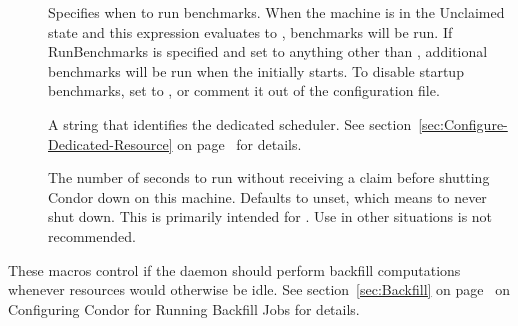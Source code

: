 \begin{description}
\item[] \label{param:RunBenchmarks}
  Specifies when to run benchmarks.
  When the machine is in the Unclaimed state and this expression
  evaluates to , benchmarks will be run.
  If RunBenchmarks is specified and set to anything other than ,
  additional benchmarks will be run when the  initially starts.
  To disable startup benchmarks, set  to ,
  or comment it out of the configuration file.

\item[] \label{param:DedicatedScheduler}
  A string that identifies the dedicated scheduler.
  See section~\ref{sec:Configure-Dedicated-Resource}
  on page~\pageref{sec:Configure-Dedicated-Resource} for details.

\item[] \label{param:StartdNoclaimShutdown}
  The number of seconds to run without receiving a claim before
  shutting Condor down on this machine.  Defaults to unset, which
  means to never shut down.  This is primarily intended for .
  Use in other situations is not recommended.

\end{description}

These macros control if the  daemon should perform
backfill computations whenever resources would otherwise be idle.  
See section~\ref{sec:Backfill} on page~\pageref{sec:Backfill} on
Configuring Condor for Running Backfill Jobs for details.


